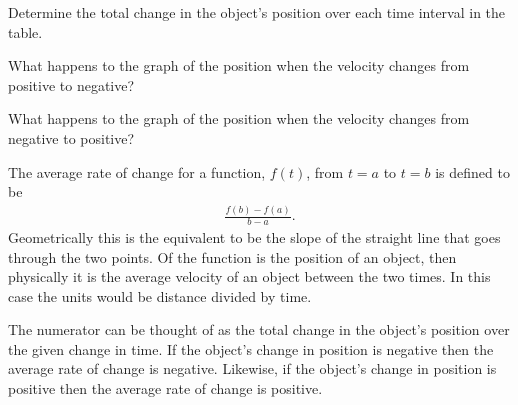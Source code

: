 \begin{problem}
\begin{subproblem}
    \scalebox{0.8}{}

    
    \clearpage

  \item Determine the total change in the object's position over each
    time interval in the table.

      \vfill

    \item What happens to the graph of the position when the velocity
      changes from positive to negative?
      \vspace{4em}

    \item What happens to the graph of the position when the velocity
      changes from negative to positive?
      \vspace{4em}

  \end{subproblem}

\end{problem}




The average rate of change for a function, $f(t)$, from $t=a$ to $t=b$ is
defined to be 
\begin{eqnarray*}
  \frac{f(b)-f(a)}{b-a}.
\end{eqnarray*}
Geometrically this is the equivalent to be the slope of the straight
line that goes through the two points. Of the function is the position
of an object, then physically it is the average velocity of an object
between the two times. In this case the units would be distance
divided by time.

\scalebox{0.5}{}

The numerator can be thought of as the total change in the object's
position over the given change in time. If the object's change in
position is negative then the average rate of change is
negative. Likewise, if the object's change in position is positive
then the average rate of change is positive.

\clearpage


